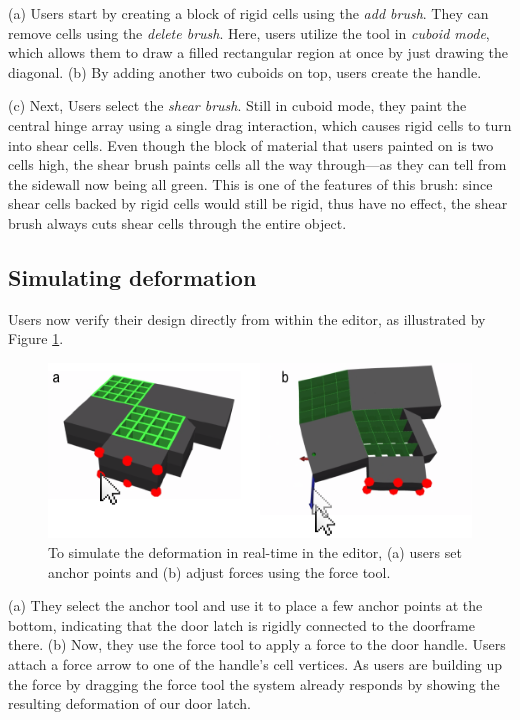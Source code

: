 (a) Users start by creating a block of rigid cells using the \textit{add brush}. They can remove cells using the \textit{delete brush}. Here, users utilize the tool in \textit{cuboid mode}, which allows them to draw a filled rectangular region at once by just drawing the diagonal. (b) By adding another two cuboids on top, users create the handle.

(c) Next, Users select the \textit{shear brush}. Still in cuboid mode, they paint the central hinge array using a single drag interaction, which causes rigid cells to turn into shear cells. Even though the block of material that users painted on is two cells high, the shear brush paints cells all the way through---as they can tell from the sidewall now being all green. This is one of the features of this brush: since shear cells backed by rigid cells would still be rigid, thus have no effect, the shear brush always cuts shear cells through the entire object. 


\subsection{Simulating deformation}
Users now verify their design directly from within the editor, as illustrated by Figure \ref{fig:22-simulation-walkthrough}. 

\begin{figure} [h]
    \includegraphics[width=\textwidth]{chapters/metamaterial-mechanisms-FIG/22-simulation-walkthrough.pdf}
    \caption[Short figure name.]{To simulate the deformation in real-time in the editor, (a) users set anchor points and (b) adjust forces using the force tool. 
    \label{fig:22-simulation-walkthrough}}
\end{figure}

(a) They select the anchor tool and use it to place a few anchor points at the bottom, indicating that the door latch is rigidly connected to the doorframe there. (b) Now, they use the force tool to apply a force to the door handle. Users attach a force arrow to one of the handle’s cell vertices. As users are building up the force by dragging the force tool the system already responds by showing the resulting deformation of our door latch. 

